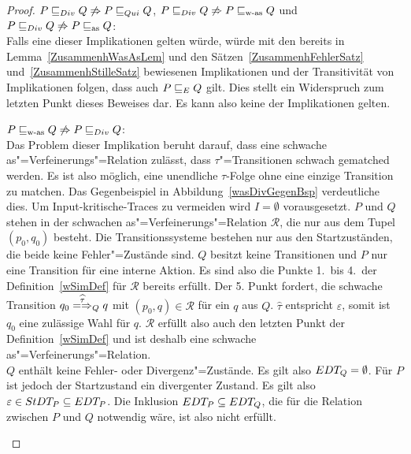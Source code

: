 \begin{proof}
  $P  \sqsubseteq  _{Div} Q \not\Rightarrow P  \sqsubseteq  _{Qui} Q$, $P  \sqsubseteq  _{Div} Q \not\Rightarrow P \sqsubseteq _{\mathrm{w}\text{-}\mathrm{as}}
  Q$ und $P  \sqsubseteq  _{Div} Q \not\Rightarrow P \sqsubseteq _{\mathrm{as}} Q$:\\
  Falls eine dieser Implikationen gelten würde, würde mit den bereits in
  Lemma~\ref{ZusammenhWasAsLem} und den Sätzen~\ref{ZusammenhFehlerSatz}
  und~\ref{ZusammenhStilleSatz} bewiesenen Implikationen und der Transitivität
  von Implikationen folgen, dass auch $P  \sqsubseteq  _E Q$ gilt. Dies stellt ein
  Widerspruch zum letzten Punkt dieses Beweises dar. Es kann also keine der
  Implikationen gelten.

  $P \sqsubseteq _{\mathrm{w}\text{-}\mathrm{as}} Q \not\Rightarrow P  \sqsubseteq  _{Div} Q$:\\
  Das Problem dieser Implikation beruht darauf, dass eine schwache
  as"=Verfeinerungs"=Relation zulässt, dass $\tau$"=Transitionen schwach
  gematched werden. Es ist also möglich, eine unendliche $\tau$-Folge ohne eine
  einzige Transition zu matchen. Das Gegenbeispiel in
  Abbildung~\ref{wasDivGegenBsp} verdeutliche dies. Um Input-kritische-Traces
  zu vermeiden wird $I=\emptyset$ vorausgesetzt. $P$ und $Q$ stehen in der
  schwachen as"=Verfeinerungs"=Relation $\mathcal{R}$, die nur aus dem Tupel
  $(p_0,q_0)$ besteht. Die Transitionssysteme bestehen nur aus den
  Startzuständen, die beide keine Fehler"=Zustände sind. $Q$ besitzt keine
  Transitionen und $P$ nur eine Transition für eine interne Aktion. Es sind
  also die Punkte 1.\ bis 4.\ der Definition~\ref{wSimDef} für $\mathcal{R}$
  bereits erfüllt. Der 5. Punkt fordert, die schwache Transition $q_0
  \weakmay[\widehat{\tau}]_Q q$ mit $(p_0,q) \in \mathcal{R}$ für ein $q$ aus
  $Q$. $\widehat{\tau}$ entspricht $\varepsilon$, somit ist $q_0$ eine
  zulässige Wahl für $q$. $\mathcal{R}$ erfüllt also auch den letzten Punkt der
  Definition~\ref{wSimDef} und ist deshalb eine schwache
  as"=Verfeinerungs"=Relation.\\
  $Q$ enthält keine Fehler- oder Divergenz"=Zustände. Es gilt also $EDT _Q=
  \emptyset$. Für $P$ ist jedoch der Startzustand ein divergenter Zustand. Es
  gilt also $\varepsilon \in StDT _P\subseteq EDT _P$. Die Inklusion $EDT _P
  \subseteq EDT _Q$, die für die Relation \DRel{} zwischen $P$ und $Q$
  notwendig wäre, ist also nicht erfüllt.

  \begin{figure}[htbp]
    \begin{center}
\end{center}
\end{figure}
\end{proof}
